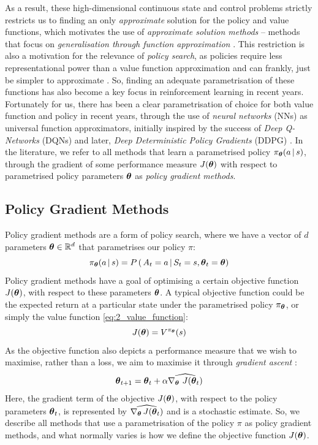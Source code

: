 As a result, these high-dimensional continuous state and control problems strictly restricts us to finding an only \textit{approximate} solution for the policy and value functions, which motivates the use of \textit{approximate solution methods} -- methods that focus on \textit{generalisation through function approximation} \cite{suttonAndBartoBook}.
This restriction is also a motivation for the relevance of \textit{policy search}, as policies require less representational power than a value function approximation \cite{BagnellPolicySearch2003} and can frankly, just be simpler to approximate \cite{suttonAndBartoBook}.
So, finding an adequate parametrisation of these functions has also become a key focus in reinforcement learning in recent years.
Fortunately for us, there has been a clear parametrisation of choice for both value function and policy in recent years, through the use of \textit{neural networks} (NNs) as universal function approximators, initially inspired by the success of \textit{Deep Q-Networks} (DQNs) \cite{DQN} and later, \textit{Deep Deterministic Policy Gradients} (DDPG) \cite{DDPG}.
In the literature, we refer to all methods that learn a parametrised policy $\pi_{\boldsymbol{\theta}} (a \, | \, s)$, through the gradient of some performance measure $J(\boldsymbol{\theta})$ with respect to parametrised policy parameters $\boldsymbol{\theta}$ as \textit{policy gradient methods}.

\subsection{Policy Gradient Methods}
\label{subsec:2_policy_gradient_methods}
Policy gradient methods are a form of policy search, where we have a vector of $d$ parameters $\boldsymbol{\theta} \in \mathbb{R}^d$ that parametrises our policy $\pi$:
\begin{equation}
    \pi_{\boldsymbol{\theta}} (a \, | \, s) = P \, ( \, A_t = a \, | \, S_t = s, \boldsymbol{\theta}_t = \boldsymbol{\theta})
\end{equation}
Policy gradient methods have a goal of optimising a certain objective function $J(\boldsymbol{\theta})$, with respect to these parameters $\boldsymbol{\theta}$. A typical objective function could be the expected return at a particular state under the parametrised policy $\pi_{\boldsymbol{\theta}}$, or simply the value function \eqref{eq:2_value_function}:
\begin{equation}
    J(\boldsymbol{\theta}) = V^{\pi_{\boldsymbol{\theta}}}(s) \label{eq:2_2_JvalueFunc}
\end{equation}
As the objective function also depicts a performance measure that we wish to maximise, rather than a loss, we aim to maximise it through \textit{gradient ascent} \cite{suttonAndBartoBook}:
\begin{equation}
    \boldsymbol{\theta}_{t+1} = \boldsymbol{\theta}_t + \alpha \widehat{\nabla_{\boldsymbol{\theta}} \, \, J(\boldsymbol{\theta}_t)} \label{eq:2_2_gradientasc}
\end{equation}
Here, the gradient term of the objective $J(\boldsymbol{\theta})$, with respect to the policy parameters $\boldsymbol{\theta}_t$, is represented by $\widehat{\nabla_{\boldsymbol{\theta}} \, J(\boldsymbol{\theta}_t)}$ and is a stochastic estimate. So, we describe all methods that use a parametrisation of the policy $\pi$ as policy gradient methods, and what normally varies is how we define the objective function $J(\boldsymbol{\theta})$.

